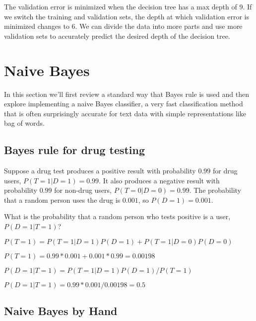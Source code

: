 \documentclass{article}
\def\blu#1{{\color{blu}#1}}
\begin{document}
The validation error is minimized when the decision tree has a max depth of 9. If we switch the training and validation sets, the depth at which validation error is minimized changes to 6. We can divide the data into more parts and use more validation sets to accurately predict the desired depth of the decision tree.


\section{Naive Bayes}

In this section we'll first review a standard way that Bayes rule is used and then explore implementing a naive Bayes classifier, a very fast classification method that is often surprisingly accurate for text data with simple representations like bag of words.


\subsection{Bayes rule for drug testing}

Suppose a drug test produces a positive result with probability $0.99$ for drug users, $P(T=1|D=1)=0.99$. It also produces a negative result with probability $0.99$ for non-drug users, $P(T=0|D=0)=0.99$. The probability that a random person uses the drug is $0.001$, so $P(D=1)=0.001$.

\blu{What is the probability that a random person who tests positive is a user, $P(D=1|T=1)$?}

$P(T=1) = P(T=1|D=1)P(D=1) + P(T=1|D=0)P(D=0)$

$P(T=1) = 0.99*0.001 + 0.001*0.99 = 0.00198$

$P(D=1|T=1) = P(T=1|D=1)P(D=1)/P(T=1)$

$P(D=1|T=1) = 0.99*0.001/0.00198 = 0.5$

\subsection{Naive Bayes by Hand}
\end{document}
